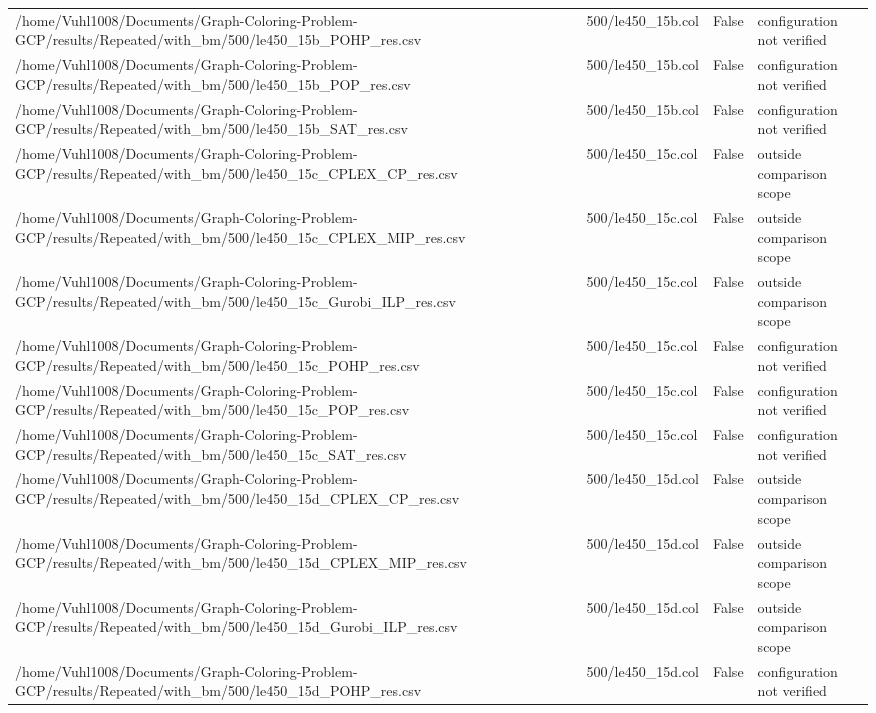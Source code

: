 \begin{table}[htbp]
\begin{tabular}{llll}
/home/Vuhl1008/Documents/Graph-Coloring-Problem-GCP/results/Repeated/with\_bm/500/le450\_15b\_POHP\_res.csv & 500/le450\_15b.col & False & configuration not verified \\
/home/Vuhl1008/Documents/Graph-Coloring-Problem-GCP/results/Repeated/with\_bm/500/le450\_15b\_POP\_res.csv & 500/le450\_15b.col & False & configuration not verified \\
/home/Vuhl1008/Documents/Graph-Coloring-Problem-GCP/results/Repeated/with\_bm/500/le450\_15b\_SAT\_res.csv & 500/le450\_15b.col & False & configuration not verified \\
/home/Vuhl1008/Documents/Graph-Coloring-Problem-GCP/results/Repeated/with\_bm/500/le450\_15c\_CPLEX\_CP\_res.csv & 500/le450\_15c.col & False & outside comparison scope \\
/home/Vuhl1008/Documents/Graph-Coloring-Problem-GCP/results/Repeated/with\_bm/500/le450\_15c\_CPLEX\_MIP\_res.csv & 500/le450\_15c.col & False & outside comparison scope \\
/home/Vuhl1008/Documents/Graph-Coloring-Problem-GCP/results/Repeated/with\_bm/500/le450\_15c\_Gurobi\_ILP\_res.csv & 500/le450\_15c.col & False & outside comparison scope \\
/home/Vuhl1008/Documents/Graph-Coloring-Problem-GCP/results/Repeated/with\_bm/500/le450\_15c\_POHP\_res.csv & 500/le450\_15c.col & False & configuration not verified \\
/home/Vuhl1008/Documents/Graph-Coloring-Problem-GCP/results/Repeated/with\_bm/500/le450\_15c\_POP\_res.csv & 500/le450\_15c.col & False & configuration not verified \\
/home/Vuhl1008/Documents/Graph-Coloring-Problem-GCP/results/Repeated/with\_bm/500/le450\_15c\_SAT\_res.csv & 500/le450\_15c.col & False & configuration not verified \\
/home/Vuhl1008/Documents/Graph-Coloring-Problem-GCP/results/Repeated/with\_bm/500/le450\_15d\_CPLEX\_CP\_res.csv & 500/le450\_15d.col & False & outside comparison scope \\
/home/Vuhl1008/Documents/Graph-Coloring-Problem-GCP/results/Repeated/with\_bm/500/le450\_15d\_CPLEX\_MIP\_res.csv & 500/le450\_15d.col & False & outside comparison scope \\
/home/Vuhl1008/Documents/Graph-Coloring-Problem-GCP/results/Repeated/with\_bm/500/le450\_15d\_Gurobi\_ILP\_res.csv & 500/le450\_15d.col & False & outside comparison scope \\
/home/Vuhl1008/Documents/Graph-Coloring-Problem-GCP/results/Repeated/with\_bm/500/le450\_15d\_POHP\_res.csv & 500/le450\_15d.col & False & configuration not verified \\

\end{tabular}
\end{table}
